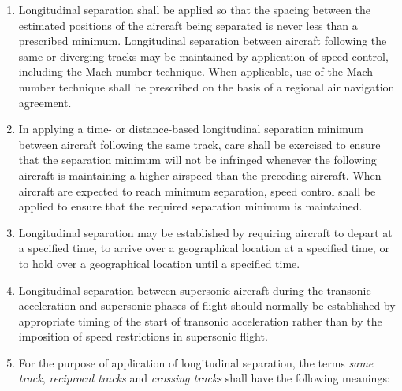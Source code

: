 \begin{enumeratesc}
    \begin{enumerate}
        \item Longitudinal separation shall be applied so that the spacing between the estimated positions of the aircraft being separated is never less than a prescribed minimum. Longitudinal separation between aircraft following the same or diverging tracks may be maintained by application of speed control, including the Mach number technique. When applicable, use of the Mach number technique shall be prescribed on the basis of a regional air navigation agreement.
        \item In applying a time- or distance-based longitudinal separation minimum between aircraft following the same track, care shall be exercised to ensure that the separation minimum will not be infringed whenever the following aircraft is maintaining a higher airspeed than the preceding aircraft. When aircraft are expected to reach minimum separation, speed control shall be applied to ensure that the required separation minimum is maintained.
        \item Longitudinal separation may be established by requiring aircraft to depart at a specified time, to arrive over a geographical location at a specified time, or to hold over a geographical location until a specified time.
        \item Longitudinal separation between supersonic aircraft during the transonic acceleration and supersonic phases of flight should normally be established by appropriate timing of the start of transonic acceleration rather than by the imposition of speed restrictions in supersonic flight.
        \item For the purpose of application of longitudinal separation, the terms \textit{same track}, \textit{reciprocal tracks} and \textit{crossing tracks} shall have the following meanings:
        

\end{enumerate}
\end{enumeratesc}

